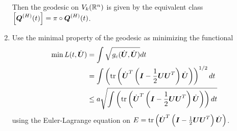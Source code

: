 \documentclass[11pt]{article}
\begin{document}
\begin{enumerate}
Then the geodesic on $V_{k}({\mathbb R}^{n}) $ is given by the equivalent class $\left[\boldsymbol{Q}^{(H)}(t) \right] = \pi\circ \boldsymbol{Q}^{(H)}(t)$.\\[15pt]

\item Use the minimal property of the geodesic as minimizing the functional
\begin{align*}
\min L(t, \dot{\boldsymbol{U}}) &= \int \sqrt{g_{c}(\dot{\boldsymbol{U}}, \dot{\boldsymbol{U}})} dt\\
&= \int \left( \mathrm{tr}\left( \dot{\boldsymbol{U}}^{T} \left( \boldsymbol{I} - \frac{1}{2}\boldsymbol{U}\boldsymbol{U}^{T} \right)  \dot{\boldsymbol{U}}  \right) \right)^{1/2} dt\\
&\le a\sqrt{\int \left( \mathrm{tr}\left( \dot{\boldsymbol{U}}^{T} \left( \boldsymbol{I} - \frac{1}{2}\boldsymbol{U}\boldsymbol{U}^{T} \right)  \dot{\boldsymbol{U}}  \right) \right)dt}
\end{align*}
using the Euler-Lagrange equation on $E = \mathrm{tr}\left( \dot{\boldsymbol{U}}^{T} \left( \boldsymbol{I} - \frac{1}{2}\boldsymbol{U}\boldsymbol{U}^{T} \right)  \dot{\boldsymbol{U}}  \right) $. 


\end{enumerate}
\end{document}
